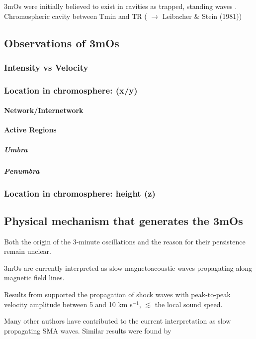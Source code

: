 
3mOs were initially believed to exist in cavities as
trapped, standing waves
\citep{Scheuer1981}.
Chromospheric cavity between Tmin and TR
(\cite{Chae2015}
$\rightarrow$
Leibacher \& Stein (1981))


\subsection{Observations of 3mOs}

\subsubsection{Intensity vs Velocity}
\subsubsection{Location in chromosphere: (x/y)}

\paragraph{Network/Internetwork}

\paragraph{Active Regions}
\subparagraph{Umbra}
\subparagraph{Penumbra}


\subsubsection{Location in chromosphere: height (z)}



\subsection{Physical mechanism that generates the 3mOs}

Both the origin of the 3-minute oscillations and the reason for their
persistence remain unclear.

3mOs are currently interpreted as slow
magnetoacoustic waves propagating along magnetic field lines.

Results from \cite{Tian2014} supported the propagation of shock waves with peak-to-peak
velocity amplitude between 5 and 10 km s$^{-1}$,
$\lesssim$ the local sound speed.

Many other authors have contributed to the
current interpretation as slow propagating SMA waves.
Similar results were found by
\cite{Brynildsen2004, Maltby1999,
DeMoortel2000}

